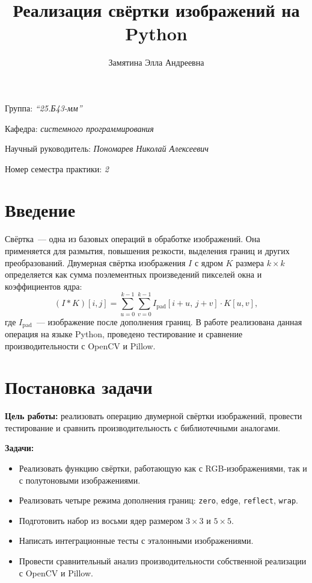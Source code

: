 \documentclass[a4paper]{article}
\title{Реализация свёртки изображений на Python}
\author{Замятина Элла Андреевна}
\date{}
\begin{document}
\maketitle

\begin{flushright}
    Группа: \emph{\enquote{25.Б43-мм}}

    Кафедра: \emph{системного программирования}

    Научный руководитель: \emph{Пономарев Николай Алексеевич}

    Номер семестра практики: \emph{2}
\end{flushright}

\section{Введение}

Свёртка~--- одна из базовых операций в обработке изображений. Она применяется для размытия, повышения резкости, выделения границ и других преобразований. Двумерная свёртка изображения $I$ с ядром $K$ размера $k \times k$ определяется как сумма поэлементных произведений пикселей окна и коэффициентов ядра:
\[
(I * K)[i, j] = \sum_{u=0}^{k-1} \sum_{v=0}^{k-1} I_{\text{pad}}[i+u,\, j+v] \cdot K[u, v],
\]
где $I_{\text{pad}}$~--- изображение после дополнения границ. В работе реализована данная операция на языке Python, проведено тестирование и сравнение производительности с OpenCV и Pillow.

\section{Постановка задачи}

\textbf{Цель работы:} реализовать операцию двумерной свёртки изображений, провести тестирование и сравнить производительность с библиотечными аналогами.

\textbf{Задачи:}
\begin{itemize}
    \item Реализовать функцию свёртки, работающую как с RGB-изображениями, так и с полутоновыми изображениями.
    \item Реализовать четыре режима дополнения границ: \verb|zero|, \verb|edge|, \verb|reflect|, \verb|wrap|.
    \item Подготовить набор из восьми ядер размером $3 \times 3$ и $5 \times 5$.
    \item Написать интеграционные тесты с эталонными изображениями.
    \item Провести сравнительный анализ производительности собственной реализации с OpenCV и Pillow.
\end{itemize}
\end{document}
